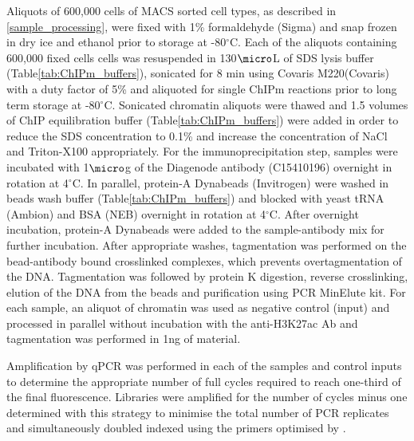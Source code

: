 Aliquots of 600,000 cells of MACS sorted cell types, as described in \ref{sample_processing}, were fixed with 1\% formaldehyde (Sigma) and snap frozen in dry ice and ethanol prior to storage at -80{$^\circ$}C. Each of the  aliquots containing 600,000 fixed cells cells was resuspended in 130$\micro$L of SDS lysis buffer (Table\ref{tab:ChIPm_buffers}), sonicated for 8 min using Covaris M220(Covaris) with a duty factor of 5\% and aliquoted for single ChIPm reactions prior to long term storage at -80{$^\circ$}C. Sonicated chromatin aliquots were thawed and 1.5 volumes of ChIP equilibration buffer (Table\ref{tab:ChIPm_buffers}) were added in order to reduce the SDS concentration to 0.1\% and increase the concentration of NaCl and Triton-X100 appropriately. For the immunoprecipitation step, samples were incubated with 1$\micro$g of the Diagenode antibody (C15410196) overnight in rotation at 4{$^\circ$}C. In parallel, protein-A Dynabeads (Invitrogen) were washed in beads wash buffer (Table\ref{tab:ChIPm_buffers}) and blocked with yeast tRNA (Ambion) and BSA (NEB) overnight in rotation at 4{$^\circ$}C. After overnight incubation, protein-A Dynabeads were added to the sample-antibody mix for further incubation. After appropriate washes, tagmentation was performed on the bead-antibody bound crosslinked complexes, which prevents overtagmentation of the DNA. Tagmentation was followed by protein K digestion, reverse crosslinking, elution of the DNA from the beads and purification using PCR MinElute kit. For each sample, an aliquot of chromatin was used as negative control (input) and processed in parallel without incubation with the anti-H3K27ac Ab and tagmentation was performed in 1ng of material.

Amplification by qPCR was performed in each of the samples and control inputs to determine the appropriate number of full cycles required to reach one-third of the final fluorescence. Libraries were amplified for the number of cycles minus one determined with this strategy to minimise the total number of PCR replicates and simultaneously doubled indexed using the primers optimised by \parencite{Buenrostro2015}.


